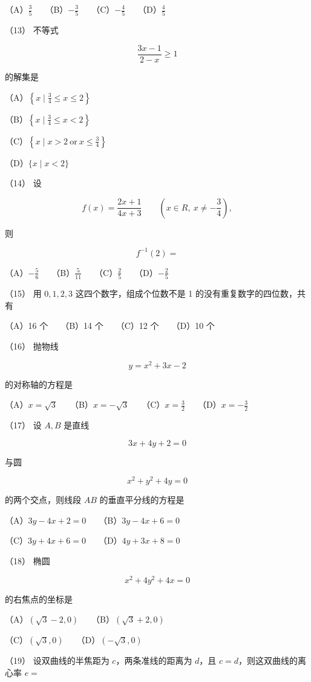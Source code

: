 \begin{question}
（A）$\frac35$　　（B）$-\frac35$　　（C）$-\frac45$　　（D）$\frac45$

（13） 不等式

\nopagebreak[4]
\[
\frac{3x-1}{2-x}\geq1
\]

的解集是

（A）$\left\{x\mid\frac34\leq x\leq2\right\}$

（B）$\left\{x\mid\frac34\leq x<2\right\}$

（C）$\left\{x\mid x>2\ \mathrm{or}\ x\leq\frac34\right\}$

（D）$\{x\mid x<2\}$

（14） 设

\nopagebreak[4]
\[
f(x)=\frac{2x+1}{4x+3}\qquad(x\in R,\ x\ne-\frac34),
\]

则

\nopagebreak[4]
\[
f^{-1}(2)=
\]

（A）$-\frac56$　　（B）$\frac5{11}$　　（C）$\frac25$　　（D）$-\frac25$

（15） 用 $0,1,2,3$ 这四个数字，组成个位数不是 1 的没有重复数字的四位数，共有

（A）16 个　　（B）14 个　　（C）12 个　　（D）10 个

（16） 抛物线

\nopagebreak[4]
\[
y=x^2+3x-2
\]

的对称轴的方程是

（A）$x=\sqrt3$　　（B）$x=-\sqrt3$　　（C）$x=\frac32$　　（D）$x=-\frac32$

（17） 设 $A,B$ 是直线

\nopagebreak[4]
\[
3x+4y+2=0
\]

与圆

\nopagebreak[4]
\[
x^2+y^2+4y=0
\]

的两个交点，则线段 $AB$ 的垂直平分线的方程是

（A）$3y-4x+2=0$　　（B）$3y-4x+6=0$

（C）$3y+4x+6=0$　　（D）$4y+3x+8=0$

（18） 椭圆

\nopagebreak[4]
\[
x^2+4y^2+4x=0
\]

的右焦点的坐标是

（A）$(\sqrt3-2,0)$　　（B）$(\sqrt3+2,0)$

（C）$(\sqrt3,0)$　　（D）$(-\sqrt3,0)$

（19） 设双曲线的半焦距为 $c$，两条准线的距离为 $d$，且 $c=d$，则这双曲线的离心率 $e=$


\end{question}
